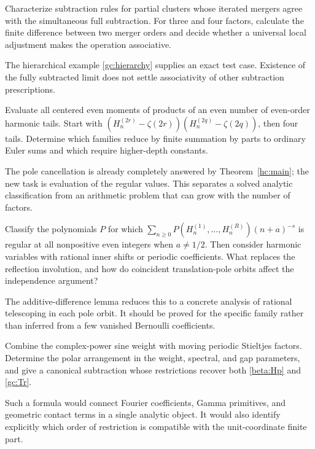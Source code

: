 \begin{question}
Characterize subtraction rules for partial clusters whose iterated
mergers agree with the simultaneous full subtraction. For three and
four factors, calculate the finite difference between two merger orders
and decide whether a universal local adjustment makes the operation
associative.
\end{question}
The hierarchical example \eqref{gc:hierarchy} supplies an exact test
case. Existence of the fully subtracted limit does not settle
associativity of other subtraction prescriptions.

\begin{question}
Evaluate all centered even moments of products of an even number of
even-order harmonic tails. Start with
$(H_n^{(2r)}-\zeta(2r))(H_n^{(2q)}-\zeta(2q))$, then four tails.
Determine which families reduce by finite summation by parts to
ordinary Euler sums and which require higher-depth constants.
\end{question}
The pole cancellation is already completely answered by
Theorem~\ref{hc:main}; the new task is evaluation of the regular values.
This separates a solved analytic classification from an arithmetic
problem that can grow with the number of factors.

\begin{question}
Classify the polynomials $P$ for which
$\sum_{n\ge0}P(H_n^{(1)},\ldots,H_n^{(R)})(n+a)^{-s}$ is regular
at all nonpositive even integers when $a\ne1/2$.
Then consider harmonic variables with rational inner shifts or periodic
coefficients. What replaces the reflection involution, and how do
coincident translation-pole orbits affect the independence argument?
\end{question}
The additive-difference lemma reduces this to a concrete analysis of
rational telescoping in each pole orbit. It should be proved for the
specific family rather than inferred from a few vanished Bernoulli
coefficients.

\begin{question}
Combine the complex-power sine weight with moving periodic Stieltjes
factors. Determine the polar arrangement in the weight, spectral, and
gap parameters, and give a canonical subtraction whose restrictions
recover both \eqref{beta:Hp} and \eqref{gc:Tr}.
\end{question}
Such a formula would connect Fourier coefficients, Gamma primitives,
and geometric contact terms in a single analytic object. It would also
identify explicitly which order of restriction is compatible with the
unit-coordinate finite part.

